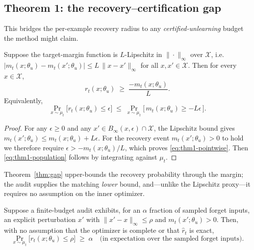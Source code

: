 \subsection{Theorem 1: the recovery--certification gap}
\label{sec:thm1}

This bridges the per-example recovery radius to any
\emph{certified-unlearning} budget the method might claim.

\begin{theorem}
\label{thm:gap}
Suppose the target-margin function is $L$-Lipschitz in $\|\cdot\|_\infty$
over $\mathcal{X}$, i.e.\ $|m_t(x;\theta_u) - m_t(x';\theta_u)| \leq
L\,\|x - x'\|_\infty$ for all $x,x' \in \mathcal{X}$. Then for every
$x \in \mathcal{X}$,
\begin{equation}
  r_t(x;\theta_u) \;\geq\; \frac{-m_t(x;\theta_u)}{L}.
  \label{eq:thm1-pointwise}
\end{equation}
Equivalently,
\begin{equation}
  \Pr_{x \sim \mu_t}\!\bigl[r_t(x;\theta_u) \leq \epsilon\bigr]
  \;\leq\;
  \Pr_{x \sim \mu_t}\!\bigl[\,m_t(x;\theta_u) \geq -L\epsilon\,\bigr].
  \label{eq:thm1-population}
\end{equation}
\end{theorem}

\begin{proof}
For any $\epsilon \geq 0$ and any $x' \in B_\infty(x,\epsilon)\cap\mathcal{X}$,
the Lipschitz bound gives
$m_t(x';\theta_u) \leq m_t(x;\theta_u) + L\epsilon$. For the recovery event
$m_t(x';\theta_u) > 0$ to hold we therefore require
$\epsilon > -m_t(x;\theta_u)/L$, which proves \eqref{eq:thm1-pointwise}.
Then \eqref{eq:thm1-population} follows by integrating against $\mu_t$.
\end{proof}

Theorem~\ref{thm:gap} upper-bounds the recovery probability through the
margin; the audit supplies the matching \emph{lower} bound, and---unlike the
Lipschitz proxy---it requires no assumption on the inner optimizer.

\begin{corollary}
\label{cor:attack-observable}
Suppose a finite-budget audit exhibits, for an $\alpha$ fraction of sampled
forget inputs, an explicit perturbation $x'$ with $\|x'-x\|_\infty \leq \rho$
and $m_t(x';\theta_u) > 0$. Then, with no assumption that the optimizer is
complete or that $\hat r_t$ is exact,
\begin{equation}
  \Pr_{x \sim \mu_t}\!\bigl[r_t(x;\theta_u) \leq \rho\bigr] \;\geq\; \alpha
  \quad\text{(in expectation over the sampled forget inputs).}
\end{equation}
\end{corollary}

